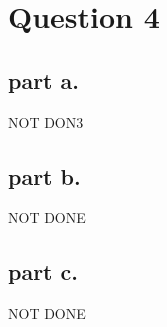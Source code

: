 \section{Question 4}

\subsection{part a.}
NOT DON3

\subsection{part b.}
NOT DONE

\subsection{part c.}
NOT DONE
